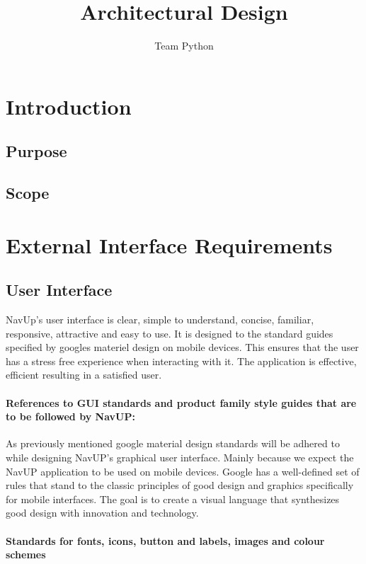 \documentclass[11pt]{article}
\author{Team Python}
\title{Architectural Design}
\begin{document}
	\setlength{\parskip}{6pt}
	
	\tableofcontents
	\newpage
	
	\section{Introduction}
    \subsection{Purpose}
	\subsection{Scope}
	
	\section{External Interface Requirements}
	\subsection{User Interface}
	NavUp's user interface is clear, simple to understand, concise, familiar, responsive, attractive and easy to use. It is designed to the standard guides specified by googles materiel design on mobile devices. This ensures that the user has a stress free experience when interacting with it. 
	The application is effective, efficient resulting in a satisfied user.
	
    \paragraph{References to GUI standards and product family style guides that are to be followed by NavUP: } 
		
		As previously mentioned google material design standards will be adhered to while designing NavUP’s graphical user interface. Mainly because we expect the NavUP application to be used on mobile devices. 
		Google has a well-defined set of rules that stand to the classic principles of good design and graphics specifically for mobile interfaces. The goal is to create a visual language that synthesizes good design with innovation and technology. 
		
	\paragraph{Standards for fonts, icons, button and labels, images and colour schemes } 
	
\end{document}
